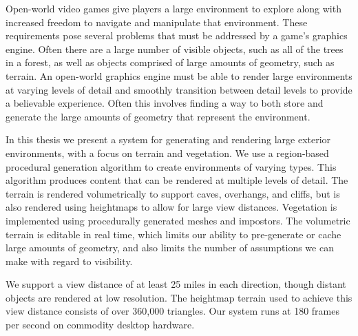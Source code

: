 Open-world video games give players a large environment to explore along with increased freedom to navigate and manipulate that environment.
These requirements pose several problems that must be addressed by a game's graphics engine.
Often there are a large number of visible objects, such as all of the trees in a forest, as well as objects comprised of large amounts of geometry, such as terrain.
An open-world graphics engine must be able to render large environments at varying levels of detail and smoothly transition between detail levels to provide a believable experience.
Often this involves finding a way to both store and generate the large amounts of geometry that represent the environment.

In this thesis we present a system for generating and rendering large exterior environments, with a focus on terrain and vegetation.
We use a region-based procedural generation algorithm to create environments of varying types.
This algorithm produces content that can be rendered at multiple levels of detail.
The terrain is rendered volumetrically to support caves, overhangs, and cliffs, but is also rendered using heightmaps to allow for large view distances.
Vegetation is implemented using procedurally generated meshes and impostors.
The volumetric terrain is editable in real time, which limits our ability to pre-generate or cache large amounts of geometry, and also limits the number of assumptions we can make with regard to visibility.

We support a view distance of at least 25 miles in each direction, though distant objects are rendered at low resolution.
The heightmap terrain used to achieve this view distance consists of over 360,000 triangles.
Our system runs at 180 frames per second on commodity desktop hardware.
